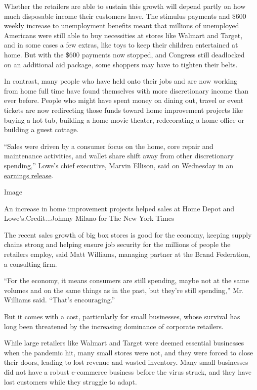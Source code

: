 Whether the retailers are able to sustain this growth will depend partly
on how much disposable income their customers have. The stimulus
payments and \$600 weekly increase to unemployment benefits meant that
millions of unemployed Americans were still able to buy necessities at
stores like Walmart and Target, and in some cases a few extras, like
toys to keep their children entertained at home. But with the \$600
payments now stopped, and Congress still deadlocked on an additional aid
package, some shoppers may have to tighten their belts.

In contrast, many people who have held onto their jobs and are now
working from home full time have found themselves with more
discretionary income than ever before. People who might have spent money
on dining out, travel or event tickets are now redirecting those funds
toward home improvement projects like buying a hot tub, building a home
movie theater, redecorating a home office or building a guest cottage.

``Sales were driven by a consumer focus on the home, core repair and
maintenance activities, and wallet share shift away from other
discretionary spending,'' Lowe's chief executive, Marvin Ellison, said
on Wednesday in an
\href{https://corporate.lowes.com/newsroom/press-releases/lowes-reports-second-quarter-2020-sales-and-earnings-results-08-19-20}{earnings
release}.

Image

An increase in home improvement projects helped sales at Home Depot and
Lowe's.Credit...Johnny Milano for The New York Times

The recent sales growth of big box stores is good for the economy,
keeping supply chains strong and helping ensure job security for the
millions of people the retailers employ, said Matt Williams, managing
partner at the Brand Federation, a consulting firm.

``For the economy, it means consumers are still spending, maybe not at
the same volumes and on the same things as in the past, but they're
still spending,'' Mr. Williams said. ``That's encouraging.''

But it comes with a cost, particularly for small businesses, whose
survival has long been threatened by the increasing dominance of
corporate retailers.

While large retailers like Walmart and Target were deemed essential
businesses when the pandemic hit, many small stores were not, and they
were forced to close their doors, leading to lost revenue and wasted
inventory. Many small businesses did not have a robust e-commerce
business before the virus struck, and they have lost customers while
they struggle to adapt.

